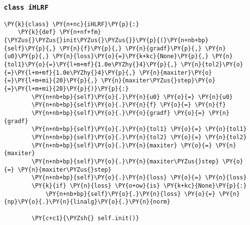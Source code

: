     \hypertarget{class-ihlrf}{%
\subsubsection{\texorpdfstring{\texttt{class\ iHLRF}}{class iHLRF}}\label{class-ihlrf}}

    \begin{tcolorbox}[breakable, size=fbox, boxrule=1pt, pad at break*=1mm,colback=cellbackground, colframe=cellborder]
\begin{Verbatim}[commandchars=\\\{\}]
\PY{k}{class} \PY{n+nc}{iHLRF}\PY{p}{:}
    \PY{k}{def} \PY{n+nf+fm}{\PYZus{}\PYZus{}init\PYZus{}\PYZus{}}\PY{p}{(}\PY{n+nb+bp}{self}\PY{p}{,} \PY{n}{f}\PY{p}{,} \PY{n}{gradf}\PY{p}{,} \PY{n}{u0}\PY{p}{,} \PY{n}{loss}\PY{o}{=}\PY{k+kc}{None}\PY{p}{,} \PY{n}{tol1}\PY{o}{=}\PY{l+m+mf}{1.0e\PYZhy{}4}\PY{p}{,} \PY{n}{tol2}\PY{o}{=}\PY{l+m+mf}{1.0e\PYZhy{}4}\PY{p}{,} \PY{n}{maxiter}\PY{o}{=}\PY{l+m+mi}{20}\PY{p}{,} \PY{n}{maxiter\PYZus{}step}\PY{o}{=}\PY{l+m+mi}{20}\PY{p}{)}\PY{p}{:}
        \PY{n+nb+bp}{self}\PY{o}{.}\PY{n}{u0} \PY{o}{=} \PY{n}{u0}
        \PY{n+nb+bp}{self}\PY{o}{.}\PY{n}{f} \PY{o}{=} \PY{n}{f} 
        \PY{n+nb+bp}{self}\PY{o}{.}\PY{n}{gradf} \PY{o}{=} \PY{n}{gradf}
        \PY{n+nb+bp}{self}\PY{o}{.}\PY{n}{tol1} \PY{o}{=} \PY{n}{tol1}
        \PY{n+nb+bp}{self}\PY{o}{.}\PY{n}{tol2} \PY{o}{=} \PY{n}{tol2}
        \PY{n+nb+bp}{self}\PY{o}{.}\PY{n}{maxiter} \PY{o}{=} \PY{n}{maxiter}
        \PY{n+nb+bp}{self}\PY{o}{.}\PY{n}{maxiter\PYZus{}step} \PY{o}{=} \PY{n}{maxiter\PYZus{}step}
        \PY{n+nb+bp}{self}\PY{o}{.}\PY{n}{loss} \PY{o}{=} \PY{n}{loss}
        \PY{k}{if} \PY{n}{loss} \PY{o+ow}{is} \PY{k+kc}{None}\PY{p}{:} 
            \PY{n+nb+bp}{self}\PY{o}{.}\PY{n}{loss} \PY{o}{=} \PY{n}{np}\PY{o}{.}\PY{n}{linalg}\PY{o}{.}\PY{n}{norm}

        \PY{c+c1}{\PYZsh{} self.init()}


\end{Verbatim}
\end{tcolorbox}
